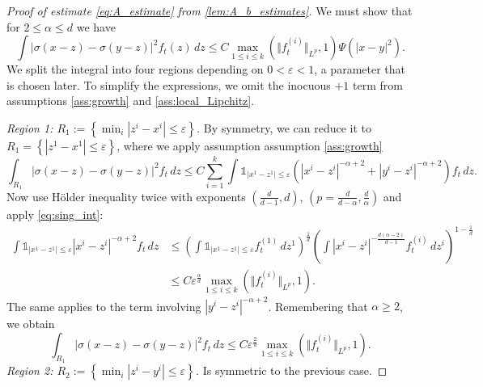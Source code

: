 \documentclass[10pt,oneside]{amsart}
\numberwithin{equation}{section}
\numberwithin{definition}{section}
\numberwithin{theorem}{section}
\numberwithin{lemma}{section}
\begin{document}
\begin{proof}[Proof of estimate \cref{eq:A_estimate} from \cref{lem:A_b_estimates}]
  We must show that for $2\leq \alpha \leq d$ we have
  \begin{equation*}
    \int\left|\sigma(x-z)-\sigma(y-z)\right|^{2}f_t(z)\,dz 
    \leq C\max_{1\leq i \leq k}(\Vert f_{t}^{(i)}\Vert _{L^{p}},1)\Psi(|x-y|^{2}).
  \end{equation*}
  We split the integral into four regions depending on ${0<\varepsilon<1}$, a parameter that is chosen later. To simplify the expressions, we omit the inocuous $+1$ term from assumptions \ref{ass:growth} and \ref{ass:local_Lipchitz}.

  \textit{Region 1: $R_{1}:=\left\{ \min_{i}|z^{i}-x^{i}|\leq\varepsilon\right\}$.} By symmetry, we can reduce it to $R_{1}=\left\{ |z^{1}-x^{1}|\leq\varepsilon\right\}$, where we apply assumption assumption \ref{ass:growth}
  \begin{equation*}
    \int_{R_{1}}|\sigma(x-z)-\sigma(y-z)|^{2}f_{t}\,dz\leq C\sum_{i=1}^{k}\int\mathds{1}_{|x^{1}-z^{1}|\leq\varepsilon}\left(|x^{i}-z^{i}|^{-\alpha+2}+|y^{i}-z^{i}|^{-\alpha+2}\right)f_{t}\,dz.
  \end{equation*}
  Now use Hölder inequality twice with exponents $\left(\frac{d}{d-1},d\right)$, $(p=\frac{d}{d-\alpha},\frac{d}{\alpha})$ and apply \cref{eq:sing_int}:
  \begin{align*}
    \int\mathds{1}_{|x^{1}-z^{1}|\leq\varepsilon}|x^{i}-z^{i}|^{-\alpha+2}f_{t}\,dz &
    \leq\left(\int\mathds{1}_{|x^{1}-z^{1}|\leq\varepsilon}f_{t}^{(1)}\,dz^{1}\right)^{\frac{1}{d}}
    \left(\int|x^{i}-z^{i}|^{-\frac{d(\alpha-2)}{d-1}}f_{t}^{(i)}\, dz^i\right)^{1-\frac{1}{d}}	\\
    &\leq C\varepsilon^{\frac{\alpha}{d}}\max_{1\leq i\leq k}(\Vert f_{t}^{(i)}\Vert_{L^{p}},1).
  \end{align*}
  The same applies to the term involving $|y^i-z^i|^{-\alpha+2}$. Remembering that $\alpha \geq 2$, we obtain
  \begin{equation*}
    \int_{R_{1}}|\sigma(x-z)-\sigma(y-z)|^{2}f_{t}\,dz\leq C\varepsilon^{\frac{2}{d}}\max_{1\leq i\leq k}(\Vert f_{t}^{(i)}\Vert_{L^{p}},1).
  \end{equation*}
  \textit{Region 2: $R_{2}:=\left\{ \min_{i}|z^{i}-y^{i}|\leq\varepsilon\right\}$.} Is symmetric to the previous case. 


\end{proof}
\end{document}
